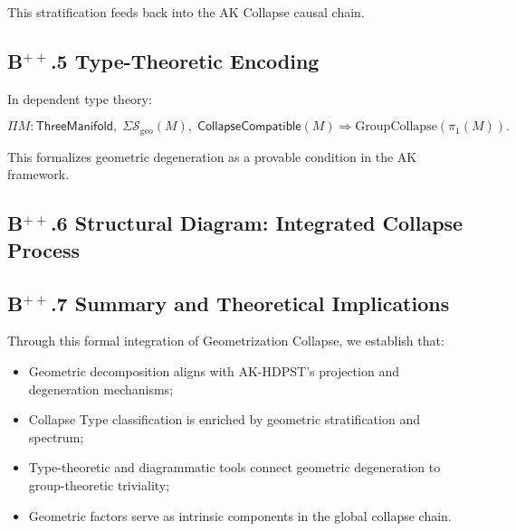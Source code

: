 \documentclass[11pt]{article}
\begin{document}
This stratification feeds back into the AK Collapse causal chain.

\subsection*{B$^{++}$.5 Type-Theoretic Encoding}

In dependent type theory:

\[
\Pi M : \mathsf{ThreeManifold},\; \Sigma \mathcal{S}_{\mathrm{geo}}(M),\; \mathsf{CollapseCompatible}(M) \Rightarrow \mathrm{GroupCollapse}(\pi_1(M)).
\]

This formalizes geometric degeneration as a provable condition in the AK framework.

\subsection*{B$^{++}$.6 Structural Diagram: Integrated Collapse Process}


\subsection*{B$^{++}$.7 Summary and Theoretical Implications}

Through this formal integration of Geometrization Collapse, we establish that:

\begin{itemize}
    \item Geometric decomposition aligns with AK-HDPST's projection and degeneration mechanisms;
    \item Collapse Type classification is enriched by geometric stratification and spectrum;
    \item Type-theoretic and diagrammatic tools connect geometric degeneration to group-theoretic triviality;
    \item Geometric factors serve as intrinsic components in the global collapse chain.
\end{itemize}
\end{document}
